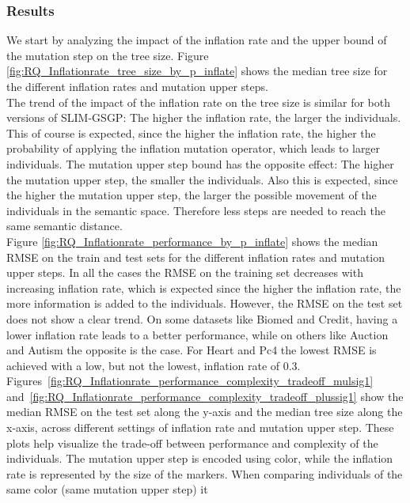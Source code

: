 \documentclass[manuscript, review, anonymous]{acmart} %
\begin{document}
\subsubsection{Results}
We start by analyzing the impact of the inflation rate
and the upper bound of the mutation step on the
tree size. Figure \ref{fig:RQ_Inflationrate_tree_size_by_p_inflate}
shows the median tree size for the different inflation rates and mutation upper steps.\\
%
The trend of the impact of the inflation rate on
the tree size is similar for both versions of SLIM-GSGP:
The higher the inflation rate, the larger the individuals. This
of course is expected, since
the higher the inflation rate, the higher the probability of
applying the inflation mutation operator, which leads to larger individuals.
The mutation upper step bound has the opposite effect: The
higher the mutation upper step, the smaller the individuals.
Also this is expected, since the higher the mutation upper step, the larger the possible movement of the individuals
in the semantic space.
Therefore less steps are needed to reach the same semantic distance.\\
Figure \ref{fig:RQ_Inflationrate_performance_by_p_inflate} shows the median RMSE on the train and
test sets for the different inflation rates and mutation upper steps.
In all the cases the RMSE on the training set
decreases with increasing inflation rate, which is expected since the
higher the inflation rate, the more information is
added to the individuals. However, the RMSE on the test
set does not show a clear trend. On some datasets
like Biomed and Credit,
having a lower inflation rate leads to a better performance,
while on others like Auction and Autism the opposite is
the case. For Heart and Pc4
the lowest RMSE is achieved with a low, but not the lowest, inflation rate of 0.3.\\
%
Figures~\ref{fig:RQ_Inflationrate_performance_complexity_tradeoff_mulsig1} 
and~\ref{fig:RQ_Inflationrate_performance_complexity_tradeoff_plussig1} 
show the median RMSE on the test set along the y-axis 
and the median tree size along the x-axis, 
across different settings of inflation rate and mutation upper step. 
These plots help visualize the trade-off between performance and complexity of the individuals.
The mutation upper step is encoded using color, 
while the inflation rate is represented by the size of the markers. 
When comparing individuals of the same color (same mutation upper step) it 
\end{document}
